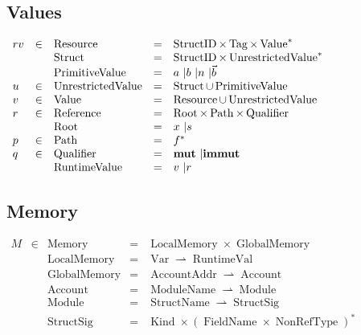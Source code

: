\documentclass{article}
\newcommand{\tmop}[1]{\ensuremath{\operatorname{#1}}}
\newcommand{\tmstrong}[1]{\textbf{#1}}
\begin{document}
\subsection{Values}

$\begin{array}{lllll}
  r v & \in & \tmop{Resource} & = & \tmop{StructID} \times \tmop{Tag} \times
  \tmop{Value}^{\ast}\\
  &  & \tmop{Struct} & = & \tmop{StructID} \times
  \tmop{UnrestrictedValue}^{\ast}\\
  &  & \tmop{PrimitiveValue} & = & \text{$a$ \textbar $b$ \textbar $n$
  \textbar $\vec{b}$}\\
  u & \in & \tmop{UnrestrictedValue} & = & \tmop{Struct} \cup
  \tmop{PrimitiveValue}\\
  v & \in & \tmop{Value} & = & \tmop{Resource} \cup \tmop{UnrestrictedValue}\\
  r & \in & \tmop{Reference} & = & \tmop{Root} \times \tmop{Path} \times
  \tmop{Qualifier}\\
  &  & \tmop{Root} & = & \text{$x$ \textbar $s$}\\
  p & \in & \tmop{Path} & = & f^{\ast}\\
  q & \in & \tmop{Qualifier} & = & \text{{\tmstrong{mut}} \textbar
  {\tmstrong{immut}}}\\
  &  & \tmop{RuntimeValue} & = & \text{$v$ \textbar $r$}
\end{array}$

\subsection{Memory}

$\begin{array}{lllll}
  M & \in & \tmop{Memory} & = & \tmop{LocalMemory} \times
  \tmop{GlobalMemory}\\
  &  & \tmop{LocalMemory} & = & \tmop{Var} \rightharpoonup
  \tmop{RuntimeVal}\\
  &  & \tmop{GlobalMemory} & = & \tmop{AccountAddr} \rightharpoonup
  \tmop{Account}\\
  &  & \tmop{Account} & = & \tmop{ModuleName} \rightharpoonup \tmop{Module}\\
  &  & \tmop{Module} & = & \tmop{StructName} \rightharpoonup
  \tmop{StructSig}\\
  &  & \tmop{StructSig} & = & \tmop{Kind} \times (\tmop{FieldName} \times
  \tmop{NonRefType})^{\ast}
\end{array}$
\end{document}
